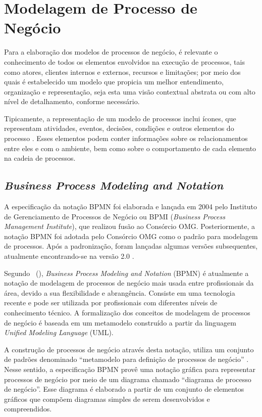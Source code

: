 \chapter{Modelagem de Processo de Negócio}
\label{cp:bpmn}

Para a elaboração dos modelos de processos de negócio, é relevante o conhecimento de todos os elementos envolvidos na execução de processos, tais como atores, clientes internos e externos, recursos e limitações; por meio dos quais é estabelecido um modelo que propicia um melhor entendimento, organização e representação, seja esta uma visão contextual abstrata ou com alto nível de detalhamento, conforme necessário. 

Tipicamente, a representação de um modelo de processos inclui ícones, que representam atividades, eventos, decisões, condições e outros elementos do processo \cite{brazil2011bpm}. Esses elementos podem conter informações sobre os relacionamentos entre eles e com o ambiente, bem como sobre o comportamento de cada elemento na cadeia de processos.

\section{\textit{Business Process Modeling and Notation}}

A especificação da notação BPMN foi elaborada e lançada em 2004 pelo Instituto de Gerenciamento de Processos de Negócio ou BPMI (\textit{Business Process Management Institute}), que realizou fusão ao Consórcio OMG. Posteriormente, a notação BPMN foi adotada pelo Consórcio OMG como o padrão para modelagem de processos. Após a padronização, foram lançadas algumas versões subsequentes, atualmente encontrando-se na versão 2.0 \cite{object2016business}.

Segundo ~(\citeyear{correia2015enhancing}), \textit{Business Process Modeling and Notation} (BPMN) é atualmente a notação de modelagem de processos de negócio mais usada entre profissionais da área, devido a sua flexibilidade e abrangência. Consiste em uma tecnologia recente e pode ser utilizada por profissionais com diferentes níveis de conhecimento técnico. A formalização dos conceitos de modelagem de processos de negócio é baseada em um metamodelo construído a partir da linguagem \textit{Unified Modeling Language} (UML). 

A construção de processos de negócio através desta notação, utiliza um conjunto de padrões denominado ``metamodelo para definição de processos de negócio'' \cite{object2016business}. Nesse sentido, a especificação BPMN provê uma notação gráfica para representar processos de negócio por meio de um diagrama chamado ``diagrama de processo de negócio''. Esse diagrama é elaborado a partir de um conjunto de elementos gráficos que compõem diagramas simples de serem desenvolvidos e
compreendidos. 

